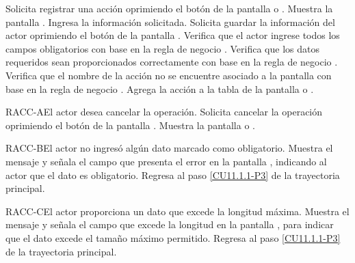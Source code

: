 \begin{UCtrayectoria}
	\UCpaso[\UCactor] Solicita registrar una acción oprimiendo el botón  de la pantalla  o .
	\UCpaso[\UCsist] Muestra la pantalla .
	\UCpaso[\UCactor] Ingresa la información solicitada. \label{CU11.1.1-P3}
	\UCpaso[\UCactor] Solicita guardar la información del actor oprimiendo el botón  de la pantalla .  
	\UCpaso[\UCsist] Verifica que el actor ingrese todos los campos obligatorios con base en la regla de negocio . 
	\UCpaso[\UCsist] Verifica que los datos requeridos sean proporcionados correctamente con base en la regla de negocio .    
	\UCpaso[\UCsist] Verifica que el nombre de la acción no se encuentre asociado a la pantalla con base en la regla de negocio .  
	\UCpaso[\UCsist] Agrega la acción a la tabla de la pantalla  o .
\end{UCtrayectoria}		

\begin{UCtrayectoriaA}{RACC-A}{El actor desea cancelar la operación.}
	\UCpaso[\UCactor] Solicita cancelar la operación oprimiendo el botón  de la pantalla .
	\UCpaso[\UCsist] Muestra la pantalla  o .
\end{UCtrayectoriaA}

\begin{UCtrayectoriaA}{RACC-B}{El actor no ingresó algún dato marcado como obligatorio.}
	\UCpaso[\UCsist] Muestra el mensaje  y señala el campo que presenta el error en la pantalla , indicando al actor que el dato es obligatorio.
	\UCpaso Regresa al paso \ref{CU11.1.1-P3} de la trayectoria principal.
\end{UCtrayectoriaA}

\begin{UCtrayectoriaA}{RACC-C}{El actor proporciona un dato que excede la longitud máxima.}
	\UCpaso[\UCsist] Muestra el mensaje  y señala el campo que excede la longitud en la pantalla , para indicar que el dato excede el tamaño máximo permitido.
	\UCpaso Regresa al paso \ref{CU11.1.1-P3} de la trayectoria principal.
\end{UCtrayectoriaA}

